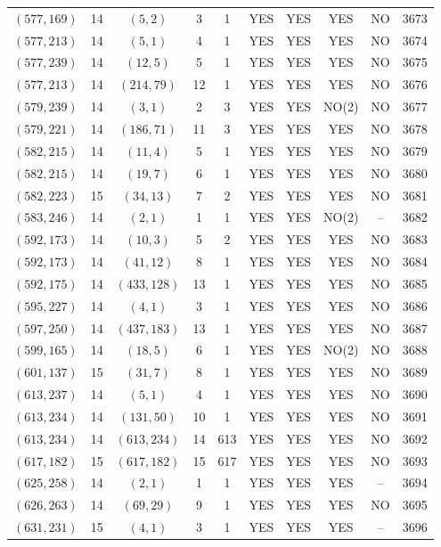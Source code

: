 \begin{longtable}{|c|c|c|c|c|c|c|c|c|c|}
$(577, 169)$ & 14 & $(5, 2)$ & 3 & 1 & YES & YES & YES & NO & 3673\\
$(577, 213)$ & 14 & $(5, 1)$ & 4 & 1 & YES & YES & YES & NO & 3674\\
$(577, 239)$ & 14 & $(12, 5)$ & 5 & 1 & YES & YES & YES & NO & 3675\\
$(577, 213)$ & 14 & $(214, 79)$ & 12 & 1 & YES & YES & YES & NO & 3676\\
$(579, 239)$ & 14 & $(3, 1)$ & 2 & 3 & YES & YES & NO(2) & NO & 3677\\
$(579, 221)$ & 14 & $(186, 71)$ & 11 & 3 & YES & YES & YES & NO & 3678\\
$(582, 215)$ & 14 & $(11, 4)$ & 5 & 1 & YES & YES & YES & NO & 3679\\
$(582, 215)$ & 14 & $(19, 7)$ & 6 & 1 & YES & YES & YES & NO & 3680\\
$(582, 223)$ & 15 & $(34, 13)$ & 7 & 2 & YES & YES & YES & NO & 3681\\
$(583, 246)$ & 14 & $(2, 1)$ & 1 & 1 & YES & YES & NO(2) & -- & 3682\\
$(592, 173)$ & 14 & $(10, 3)$ & 5 & 2 & YES & YES & YES & NO & 3683\\
$(592, 173)$ & 14 & $(41, 12)$ & 8 & 1 & YES & YES & YES & NO & 3684\\
$(592, 175)$ & 14 & $(433, 128)$ & 13 & 1 & YES & YES & YES & NO & 3685\\
$(595, 227)$ & 14 & $(4, 1)$ & 3 & 1 & YES & YES & YES & NO & 3686\\
$(597, 250)$ & 14 & $(437, 183)$ & 13 & 1 & YES & YES & YES & NO & 3687\\
$(599, 165)$ & 14 & $(18, 5)$ & 6 & 1 & YES & YES & NO(2) & NO & 3688\\
$(601, 137)$ & 15 & $(31, 7)$ & 8 & 1 & YES & YES & YES & NO & 3689\\
$(613, 237)$ & 14 & $(5, 1)$ & 4 & 1 & YES & YES & YES & NO & 3690\\
$(613, 234)$ & 14 & $(131, 50)$ & 10 & 1 & YES & YES & YES & NO & 3691\\
$(613, 234)$ & 14 & $(613, 234)$ & 14 & 613 & YES & YES & YES & NO & 3692\\
$(617, 182)$ & 15 & $(617, 182)$ & 15 & 617 & YES & YES & YES & NO & 3693\\
$(625, 258)$ & 14 & $(2, 1)$ & 1 & 1 & YES & YES & YES & -- & 3694\\
$(626, 263)$ & 14 & $(69, 29)$ & 9 & 1 & YES & YES & YES & NO & 3695\\
$(631, 231)$ & 15 & $(4, 1)$ & 3 & 1 & YES & YES & YES & -- & 3696\\

\end{longtable}
